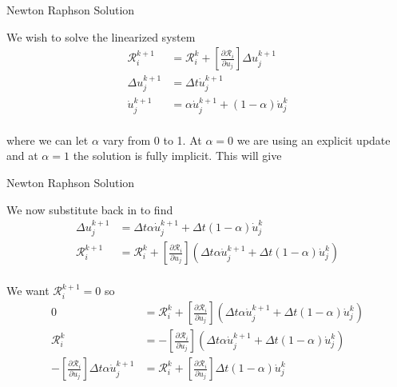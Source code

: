 \documentclass[11pt]{beamer}
\begin{document}
\begin{frame}{Newton Raphson Solution}

We wish to solve the linearized system
\begin{align*}
\mathcal{R}^{k+1}_{i} &= \mathcal{R}^k_i + \left[\frac{\partial \mathcal{R}_i}{\partial u_j}\right] \Delta u_j^{k+1}\\
\Delta u_j^{k+1} &= \Delta t \dot{u}_j^{k+1}\\
\dot{u}_j^{k+1} &= \alpha \dot{u}_j^{k+1} + \left(1-\alpha\right) \dot{u}_j^{k}\\
\end{align*}

where we can let $\alpha$ vary from 0 to 1. At $\alpha=0$ we are using an explicit update and at $\alpha = 1$ the solution is fully implicit. This will give 
\end{frame}

\begin{frame}{Newton Raphson Solution}

We now substitute back in to find
\begin{align*}
\Delta u_j^{k+1} &= \Delta t \alpha \dot{u}_j^{k+1} + \Delta t \left(1-\alpha\right) \dot{u}_j^k\\
\mathcal{R}^{k+1}_{i} &= \mathcal{R}^k_i + \left[\frac{\partial \mathcal{R}_i}{\partial u_j}\right] \left(\Delta t \alpha \dot{u}_j^{k+1} + \Delta t \left(1-\alpha\right) \dot{u}_j^k\right)\\
\end{align*}

We want $\mathcal{R}_i^{k+1} = 0$ so
\begin{align*}
0 &= \mathcal{R}^k_i + \left[\frac{\partial \mathcal{R}_i}{\partial u_j}\right] \left(\Delta t \alpha \dot{u}_j^{k+1} + \Delta t \left(1-\alpha\right) \dot{u}_j^k\right)\\
\mathcal{R}_i^k &= - \left[\frac{\partial \mathcal{R}_i}{\partial u_j}\right] \left(\Delta t \alpha \dot{u}_j^{k+1} + \Delta t \left(1-\alpha\right) \dot{u}_j^k\right)\\
- \left[\frac{\partial \mathcal{R}_i}{\partial u_j}\right] \Delta t \alpha \dot{u}_j^{k+1} &= \mathcal{R}_i^k + \left[\frac{\partial \mathcal{R}_i}{\partial u_j}\right] \Delta t \left(1-\alpha\right) \dot{u}_j^k
\end{align*}

\end{frame}
\end{document}

